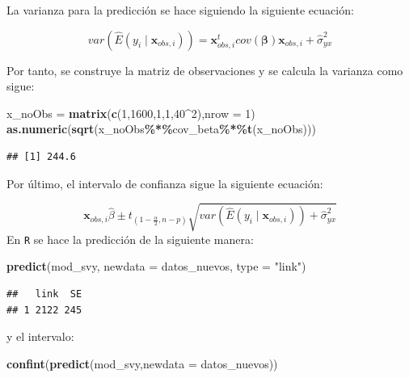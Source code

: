 \documentclass[
  spanish,
  12pt,
]{book}
\newenvironment{Shaded}{\begin{snugshade}}{\end{snugshade}}
\newcommand{\AttributeTok}[1]{\textcolor[rgb]{0.13,0.29,0.53}{#1}}
\newcommand{\DecValTok}[1]{\textcolor[rgb]{0.00,0.00,0.81}{#1}}
\newcommand{\FunctionTok}[1]{\textcolor[rgb]{0.13,0.29,0.53}{\textbf{#1}}}
\newcommand{\NormalTok}[1]{#1}
\newcommand{\OtherTok}[1]{\textcolor[rgb]{0.56,0.35,0.01}{#1}}
\newcommand{\SpecialCharTok}[1]{\textcolor[rgb]{0.81,0.36,0.00}{\textbf{#1}}}
\newcommand{\StringTok}[1]{\textcolor[rgb]{0.31,0.60,0.02}{#1}}
\begin{document}
La varianza para la predicción se hace siguiendo la siguiente ecuación:

\[
var\left(\hat{E}\left(y_{i}\mid\boldsymbol{x}_{obs,i}\right)\right)=\boldsymbol{x}_{obs,i}^{t}cov\left(\boldsymbol{\beta}\right)\boldsymbol{x}_{obs,i} + \hat{\sigma}^2_{yx}
\]

Por tanto, se construye la matriz de observaciones y se calcula la varianza como sigue:

\begin{Shaded}
\begin{Highlighting}[]
\NormalTok{x\_noObs }\OtherTok{=} \FunctionTok{matrix}\NormalTok{(}\FunctionTok{c}\NormalTok{(}\DecValTok{1}\NormalTok{,}\DecValTok{1600}\NormalTok{,}\DecValTok{1}\NormalTok{,}\DecValTok{1}\NormalTok{,}\DecValTok{40}\SpecialCharTok{\^{}}\DecValTok{2}\NormalTok{),}\AttributeTok{nrow =} \DecValTok{1}\NormalTok{)}
\FunctionTok{as.numeric}\NormalTok{(}\FunctionTok{sqrt}\NormalTok{(x\_noObs}\SpecialCharTok{\%*\%}\NormalTok{cov\_beta}\SpecialCharTok{\%*\%}\FunctionTok{t}\NormalTok{(x\_noObs)))}
\end{Highlighting}
\end{Shaded}

\begin{verbatim}
## [1] 244.6
\end{verbatim}

Por último, el intervalo de confianza sigue la siguiente ecuación:

\[
\boldsymbol{x}_{obs,i}\hat{\beta}\pm t_{\left(1-\frac{\alpha}{2},n-p\right)}\sqrt{var\left(\hat{E}\left(y_{i}\mid\boldsymbol{x}_{obs,i}\right)\right)+\hat{\sigma}_{yx}^{2}}
\]
En \texttt{R} se hace la predicción de la siguiente manera:

\begin{Shaded}
\begin{Highlighting}[]
\FunctionTok{predict}\NormalTok{(mod\_svy, }\AttributeTok{newdata =}\NormalTok{ datos\_nuevos, }\AttributeTok{type =}  \StringTok{"link"}\NormalTok{)}
\end{Highlighting}
\end{Shaded}

\begin{verbatim}
##   link  SE
## 1 2122 245
\end{verbatim}

y el intervalo:

\begin{Shaded}
\begin{Highlighting}[]
\FunctionTok{confint}\NormalTok{(}\FunctionTok{predict}\NormalTok{(mod\_svy,}\AttributeTok{newdata =}\NormalTok{ datos\_nuevos))}
\end{Highlighting}
\end{Shaded}
\end{document}
